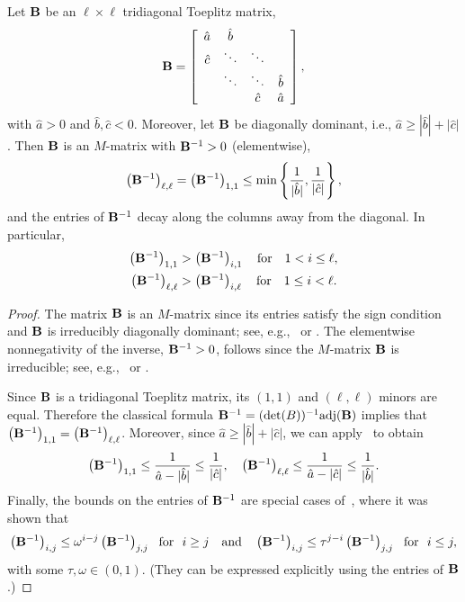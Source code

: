 \begin{lemma}\label{lem:1D:MMat}
Let $\mathbf{B}$ be an $\ell\times \ell$ tridiagonal Toeplitz matrix,
%
\begin{equation*}%
\B=\left[\begin{array}{cccc}
\hat{a} & \hat{b}\\
\hat{c} & \ddots & \ddots\\
 & \ddots & \ddots & \hat{b}\\
 &  & \hat{c} & \hat{a}
\end{array}\right],
\end{equation*}
%
with $\hat{a}>0$ and $\hat{b},\hat{c}<0$. Moreover, let $\mathbf{B}$ be diagonally
dominant, i.e., $\hat{a}\geq |\hat{b}|+|\hat{c}|$. Then $\mathbf{B}$ is an $M$-matrix
with $\mathbf{B}^{-1}>0$ (elementwise),
%
\begin{equation}\label{eq:min_cond}
\left(\mathbf{B}^{-1}\right)_{\ell,\ell}=\left(\mathbf{B}^{-1}\right)_{1,1} \leq \min\left\{\frac{1}{|\hat{b}|},\frac{1}{|\hat{c}|}\right\},
\end{equation}
%
and the entries of $\mathbf{B}^{-1}$ decay along the columns away from the diagonal.
In particular,
%
\begin{align*}
\left(\mathbf{B}^{-1}\right)_{1,1} & > \left(\mathbf{B}^{-1}\right)_{i,1}\quad \mbox{for}\quad 1<i\leq\ell,\\
\left(\mathbf{B}^{-1}\right)_{\ell,\ell} & > \left(\mathbf{B}^{-1}\right)_{i,\ell}\quad \mbox{for}\quad 1\leq i<\ell.
\end{align*}
%
\end{lemma}
%
\begin{proof}
The matrix $\mathbf{B}$ is an $M$-matrix since its entries satisfy the sign condition
and $\mathbf{B}$ is irreducibly diagonally dominant; see, e.g.,~\cite[Theorem 6.2.3,
Condition M35]{BerPle94} or \cite[Criterion~4.3.10]{Hac10}.
The elementwise nonnegativity of the inverse, $\mathbf{B}^{-1}>0$, follows since the
$M$-matrix $\mathbf{B}$ is irreducible; see, e.g.,~\cite[Theorem 6.2.7]{BerPle94} or
\cite[Theorem~4.3.11]{Hac10}.

Since $\mathbf{B}$ is a tridiagonal Toeplitz matrix, its $(1,1)$ and $(\ell,\ell)$
minors are equal. Therefore the classical formula
$\mathbf{B}^{-1}=(\det(B))^{-1}\textrm{adj}(\mathbf{B})$ implies that
$\left(\mathbf{B}^{-1}\right)_{1,1}=\left(\mathbf{B}^{-1}\right)_{\ell,\ell}$. Moreover, since
$\hat{a}\geq |\hat{b}|+|\hat{c}|$, we can
apply~\cite[Lemma~2.1, equation (2.8)]{Nabben99} to obtain
%
$$
\left(\mathbf{B}^{-1}\right)_{1,1} \leq \frac{1}{\hat{a}-|\hat{b}|}\leq \frac{1}{|\hat{c}|},\quad
\left(\mathbf{B}^{-1}\right)_{\ell,\ell} \leq \frac{1}{\hat{a}-|\hat{c}|}\leq \frac{1}{|\hat{b}|}.$$
%
Finally, the bounds on the entries of $\mathbf{B}^{-1}$ are special cases
of~\cite[Theorem 3.11]{Nabben99}, where it was shown that
%
$$\left(\mathbf{B}^{-1}\right)_{i,j}\leq \omega^{i-j} \left(\mathbf{B}^{-1}\right)_{j,j}\ \ \mbox{for}\ \ i\geq j
\quad\mbox{and}\quad
\left(\mathbf{B}^{-1}\right)_{i,j}\leq \tau^{j-i} \left(\mathbf{B}^{-1}\right)_{j,j}\ \ \mbox{for}\ \ i\leq j, $$
%
with some $\tau,\omega\in (0,1)$. (They can be expressed explicitly using the
entries of $\mathbf{B}$.)
\end{proof}

